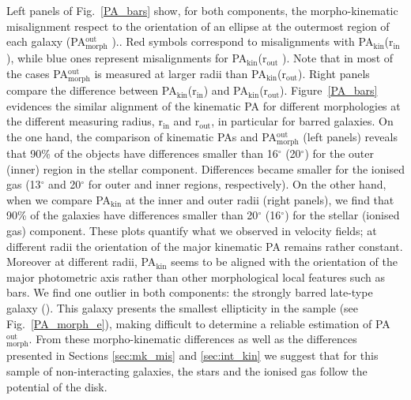 \documentclass[longauth,traditabstract]{aa}
\begin{document}
Left panels of Fig.~\ref{PA_bars} show, for both components, the morpho-kinematic misalignment respect to the orientation of an ellipse at the outermost region of each galaxy (PA$\mathrm{_{morph}^{out}}$ ).. Red symbols correspond to misalignments with PA$_{\mathrm{kin}}$(r$_{\mathrm{in}}$), while blue ones represent misalignments for PA$_{\mathrm{kin}}$(r$_{\mathrm{out}}$ ). Note that in most of the cases PA$\mathrm{_{morph}^{out}}$ is measured at larger radii than  PA$_{\mathrm{kin}}$(r$_{\mathrm{out}}$). Right panels compare the difference between PA$_{\mathrm{kin}}$(r$_{\mathrm{in}}$) and PA$_{\mathrm{kin}}$(r$_{\mathrm{out}}$). Figure~\ref{PA_bars} evidences the similar alignment of the kinematic PA for different morphologies  at the different measuring radius, r$_{\mathrm{in}}$ and r$_{\mathrm{out}}$, in particular for barred galaxies. On the one hand, the comparison of kinematic PAs and PA$\mathrm{_{morph}^{out}}$
(left panels) reveals that 90\% of the objects have differences smaller than
16$^\circ$ (20$^\circ$) for the outer (inner) region in the stellar component.
Differences became smaller for the ionised gas (13$^\circ$ and 20$^\circ$ for
outer and inner regions, respectively). On the other hand, when we compare PA$_{\mathrm{kin}}$ at the inner and outer radii (right panels), we find that 90\% of the galaxies have differences smaller than 20$^\circ$ (16$^\circ$) for the stellar (ionised gas) component. These plots quantify what we observed in velocity fields; at different radii the orientation of the major kinematic PA remains rather constant. Moreover at different radii, PA$_{\mathrm{kin}}$ seems to be aligned with the orientation of the major photometric axis rather than other morphological local features such as bars. We find one outlier in both components: the strongly barred late-type galaxy (). This galaxy presents the smallest ellipticity in the sample (see Fig.~\ref{PA_morph_e}), making difficult to determine a reliable estimation of PA$\mathrm{_{morph}^{out}}$. From these morpho-kinematic differences as well as the differences presented in Sections \ref{sec:mk_mis} and \ref{sec:int_kin} we suggest that  for this sample of non-interacting galaxies, the stars and the ionised gas follow the potential of the disk. 
\end{document}
